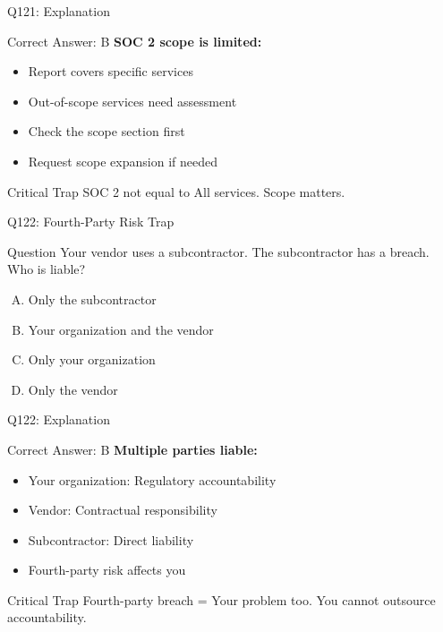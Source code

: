 \documentclass{beamer}
\begin{document}
	\begin{frame}{Q121: Explanation}
		\begin{block}{Correct Answer: B}
			\textbf{SOC 2 scope is limited:}
			\begin{itemize}
				\item Report covers specific services
				\item Out-of-scope services need assessment
				\item Check the scope section first
				\item Request scope expansion if needed
			\end{itemize}
		\end{block}
		\begin{alertblock}{Critical Trap}
			SOC 2 not equal to All services.
			Scope matters.
		\end{alertblock}
	\end{frame}
	
	\begin{frame}{Q122: Fourth-Party Risk Trap}
		\begin{block}{Question}
			Your vendor uses a subcontractor. The subcontractor has a breach. Who is liable?
		\end{block}
		\begin{enumerate}[(A)]
			\item Only the subcontractor
			\item Your organization and the vendor
			\item Only your organization
			\item Only the vendor
		\end{enumerate}
	\end{frame}
	
	\begin{frame}{Q122: Explanation}
		\begin{block}{Correct Answer: B}
			\textbf{Multiple parties liable:}
			\begin{itemize}
				\item Your organization: Regulatory accountability
				\item Vendor: Contractual responsibility
				\item Subcontractor: Direct liability
				\item Fourth-party risk affects you
			\end{itemize}
		\end{block}
		\begin{alertblock}{Critical Trap}
			Fourth-party breach = Your problem too.
			You cannot outsource accountability.
		\end{alertblock}
	\end{frame}
	
\end{document}
